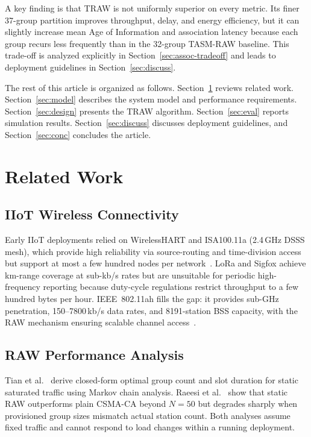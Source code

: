 \documentclass[journal]{IEEEtran}
\begin{document}
A key finding is that TRAW is not uniformly superior on every metric.
Its finer 37-group partition improves throughput, delay, and energy
efficiency, but it can slightly increase mean Age of Information and
association latency because each group recurs less frequently than in
the 32-group TASM-RAW baseline. This trade-off is analyzed explicitly in
Section~\ref{sec:assoc-tradeoff} and leads to deployment guidelines in
Section~\ref{sec:discuss}.

The rest of this article is organized as follows. Section~\ref{sec:related}
reviews related work. Section~\ref{sec:model} describes the system model
and performance requirements. Section~\ref{sec:design} presents the TRAW
algorithm. Section~\ref{sec:eval} reports simulation results.
Section~\ref{sec:discuss} discusses deployment guidelines, and
Section~\ref{sec:conc} concludes the article.

\section{Related Work}
\label{sec:related}

\subsection{IIoT Wireless Connectivity}

Early IIoT deployments relied on WirelessHART and ISA100.11a
(2.4\,GHz DSSS mesh), which provide high reliability via source-routing
and time-division access but support at most a few hundred nodes per
network~\cite{chen2017iiot}.
LoRa and Sigfox achieve km-range coverage at sub-kb/s rates but are
unsuitable for periodic high-frequency reporting because duty-cycle
regulations restrict throughput to a few hundred bytes per hour.
IEEE~802.11ah fills the gap: it provides sub-GHz penetration, 150--7800\,kb/s
data rates, and 8191-station BSS capacity, with the RAW mechanism
ensuring scalable channel access~\cite{Sisinni2018}.

\subsection{RAW Performance Analysis}

Tian et al.~\cite{tian2016} derive closed-form optimal group count and
slot duration for static saturated traffic using Markov chain analysis.
Raeesi et al.~\cite{raeesi2014} show that static RAW outperforms plain
CSMA-CA beyond $N\!=\!50$ but degrades sharply when provisioned group
sizes mismatch actual station count.
Both analyses assume fixed traffic and cannot respond to load changes
within a running deployment.
\end{document}
